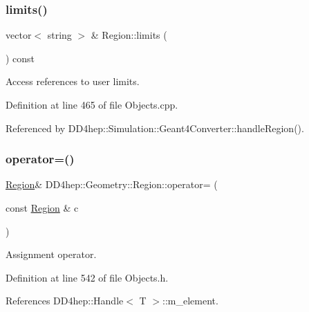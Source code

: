 \hypertarget{class_d_d4hep_1_1_geometry_1_1_region_a9aa3963529a3eec97d64390478a190c8}{}\label{class_d_d4hep_1_1_geometry_1_1_region_a9aa3963529a3eec97d64390478a190c8} 
\subsubsection{\texorpdfstring{limits()}{limits()}}
{\footnotesize\ttfamily vector$<$ string $>$ \& Region\+::limits (\begin{DoxyParamCaption}{ }\end{DoxyParamCaption}) const}



Access references to user limits. 



Definition at line 465 of file Objects.\+cpp.



Referenced by D\+D4hep\+::\+Simulation\+::\+Geant4\+Converter\+::handle\+Region().

\hypertarget{class_d_d4hep_1_1_geometry_1_1_region_acd0e2208ce7854c4dead0764782cace9}{}\label{class_d_d4hep_1_1_geometry_1_1_region_acd0e2208ce7854c4dead0764782cace9} 
\subsubsection{\texorpdfstring{operator=()}{operator=()}}
{\footnotesize\ttfamily \hyperlink{class_d_d4hep_1_1_geometry_1_1_region}{Region}\& D\+D4hep\+::\+Geometry\+::\+Region\+::operator= (\begin{DoxyParamCaption}\item[{const \hyperlink{class_d_d4hep_1_1_geometry_1_1_region}{Region} \&}]{c }\end{DoxyParamCaption})\hspace{0.3cm}{\ttfamily [inline]}}



Assignment operator. 



Definition at line 542 of file Objects.\+h.



References D\+D4hep\+::\+Handle$<$ T $>$\+::m\+\_\+element.

